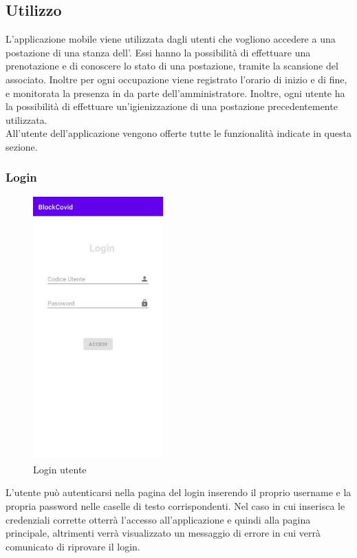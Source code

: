 	\subsection{Utilizzo}
	L'applicazione mobile viene utilizzata dagli utenti che vogliono accedere a una postazione di una stanza dell'. Essi hanno la possibilità di effettuare una prenotazione e di conoscere lo stato di una postazione, tramite la scansione del  associato. Inoltre per ogni occupazione viene registrato l'orario di inizio e di fine, e monitorata la presenza in  da parte dell'amministratore. Inoltre, ogni utente ha la possibilità di effettuare un'igienizzazione di una postazione precedentemente utilizzata. 
	\\All'utente dell'applicazione vengono offerte tutte le funzionalità indicate in questa sezione.
	\subsubsection{Login}
	\begin{figure}[H]
		\centering
		\includegraphics[width=5cm]{res/images/login.png}
		\caption{Login utente}
	\end{figure}
	L'utente può autenticarsi nella pagina del login inserendo il proprio username e la propria password nelle caselle di testo corrispondenti.
	Nel caso in cui inserisca le credenziali corrette otterrà l'accesso all'applicazione e quindi alla pagina principale, altrimenti verrà visualizzato un messaggio di errore in cui verrà comunicato di riprovare il login.
	
